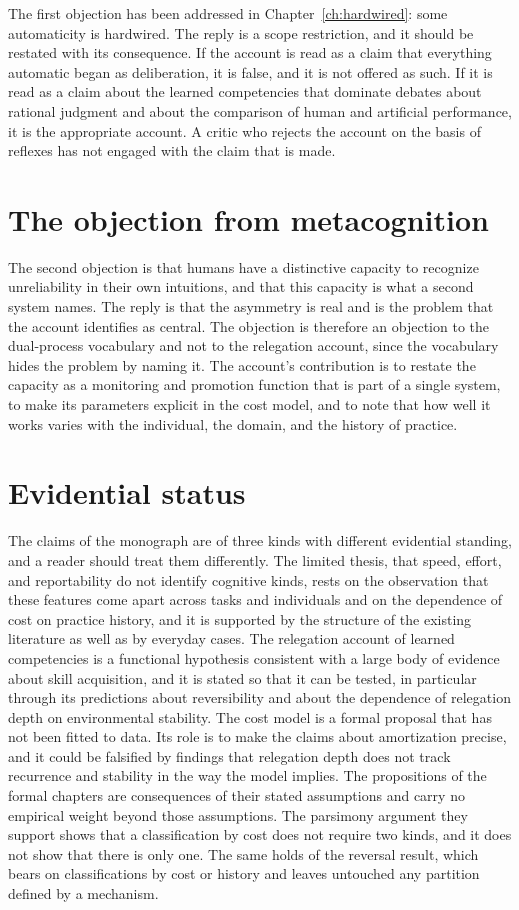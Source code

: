 \documentclass[11pt]{report}
\theoremstyle{remark}
\theoremstyle{definition}
\begin{document}
The first objection has been addressed in Chapter~\ref{ch:hardwired}: some automaticity is hardwired. The reply is a scope restriction, and it should be restated with its consequence. If the account is read as a claim that everything automatic began as deliberation, it is false, and it is not offered as such. If it is read as a claim about the learned competencies that dominate debates about rational judgment and about the comparison of human and artificial performance, it is the appropriate account. A critic who rejects the account on the basis of reflexes has not engaged with the claim that is made.

\section{The objection from metacognition}

The second objection is that humans have a distinctive capacity to recognize unreliability in their own intuitions, and that this capacity is what a second system names. The reply is that the asymmetry is real and is the problem that the account identifies as central. The objection is therefore an objection to the dual-process vocabulary and not to the relegation account, since the vocabulary hides the problem by naming it. The account's contribution is to restate the capacity as a monitoring and promotion function that is part of a single system, to make its parameters explicit in the cost model, and to note that how well it works varies with the individual, the domain, and the history of practice.

\section{Evidential status}

The claims of the monograph are of three kinds with different evidential standing, and a reader should treat them differently. The limited thesis, that speed, effort, and reportability do not identify cognitive kinds, rests on the observation that these features come apart across tasks and individuals and on the dependence of cost on practice history, and it is supported by the structure of the existing literature as well as by everyday cases. The relegation account of learned competencies is a functional hypothesis consistent with a large body of evidence about skill acquisition, and it is stated so that it can be tested, in particular through its predictions about reversibility and about the dependence of relegation depth on environmental stability. The cost model is a formal proposal that has not been fitted to data. Its role is to make the claims about amortization precise, and it could be falsified by findings that relegation depth does not track recurrence and stability in the way the model implies. The propositions of the formal chapters are consequences of their stated assumptions and carry no empirical weight beyond those assumptions. The parsimony argument they support shows that a classification by cost does not require two kinds, and it does not show that there is only one. The same holds of the reversal result, which bears on classifications by cost or history and leaves untouched any partition defined by a mechanism.
\end{document}
